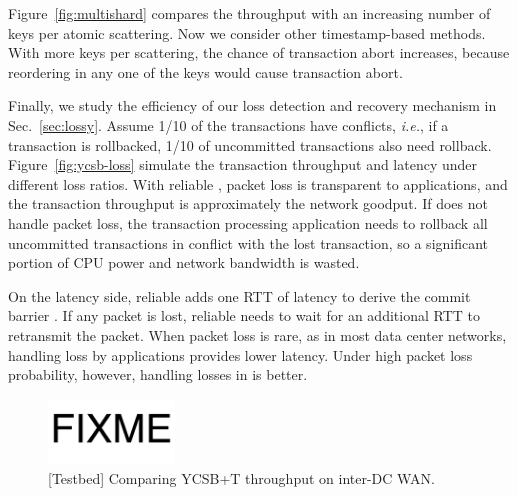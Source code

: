 Figure~\ref{fig:multishard} compares the throughput  with an increasing number of keys per atomic scattering.
Now we consider other timestamp-based methods.
With more keys per scattering, the chance of transaction abort increases, because reordering in any one of the keys would cause transaction abort.


Finally, we study the efficiency of our loss detection and recovery mechanism in Sec.~\ref{sec:lossy}.
Assume 1/10 of the transactions have conflicts, \textit{i.e.}, if a transaction is rollbacked, 1/10 of uncommitted transactions also need rollback.
Figure~\ref{fig:ycsb-loss} simulate the transaction throughput and latency under different loss ratios.
With reliable \sys, packet loss is transparent to applications, and the transaction throughput is approximately the network goodput.
If \sys does not handle packet loss, the transaction processing application needs to rollback all uncommitted transactions in conflict with the lost transaction, so a significant portion of CPU power and network bandwidth is wasted.

On the latency side, reliable \sys adds one RTT of latency to derive the commit barrier .
If any packet is lost, reliable \sys needs to wait for an additional RTT to retransmit the packet.
When packet loss is rare, as in most data center networks, handling loss by applications provides lower latency.
Under high packet loss probability, however, handling losses in \sys is better.

\iffalse
\begin{figure}[t]
\centering
\includegraphics[width=0.3\textwidth]{images/fixme.pdf}
\caption{[Testbed] Comparing YCSB+T throughput on inter-DC WAN.}
\vspace{-10pt}
\label{fig:ycsb-inter-dc}
\end{figure}

